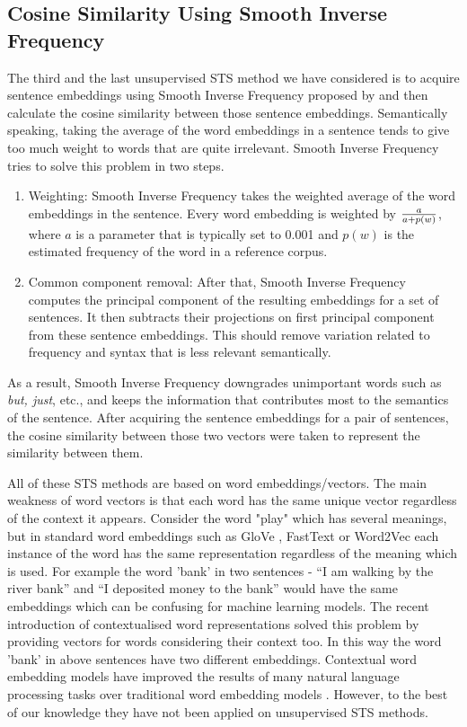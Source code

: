 \subsection{Cosine Similarity Using Smooth Inverse Frequency}
The third and the last unsupervised STS method we have considered is to acquire sentence embeddings using Smooth Inverse Frequency proposed by \citet{DBLP:conf/iclr/AroraLM17} and then calculate the cosine similarity between those sentence embeddings. Semantically speaking, taking the average of the word embeddings in a sentence tends to give too much weight to words that are quite irrelevant. Smooth Inverse Frequency tries to solve this problem in two steps. 

\begin{enumerate}
	\item Weighting: Smooth Inverse Frequency takes the weighted average of the word embeddings in the sentence. Every word embedding is weighted by $a\over{a + p(w)}$, where $a$ is a parameter that is typically set to 0.001 and $p(w)$ is the estimated frequency of the word in a reference corpus. 
	\item Common component removal: After that, Smooth Inverse Frequency computes the principal component of the resulting embeddings for a set of sentences. It then subtracts their projections on first principal component from these sentence embeddings. This should remove variation related to frequency and syntax that is less relevant semantically.
\end{enumerate}

As a result, Smooth Inverse Frequency downgrades unimportant words such as \emph{but, just}, etc., and keeps the information that contributes most to the semantics of the sentence. After acquiring the sentence embeddings for a pair of sentences, the cosine similarity between those two vectors were taken to represent the similarity between them. 

All of these STS methods are based on word embeddings/vectors. The main weakness of word vectors is that each word has the same unique vector regardless of the context it appears. Consider the word "play" which has several meanings, but in standard word embeddings such as GloVe \cite{pennington2014glove}, FastText \cite{mikolov-etal-2018-advances} or Word2Vec  \cite{10.5555/2999792.2999959} each instance of the word has the same representation regardless of the meaning which is used. For example the word 'bank' in two sentences - ``I am walking by the river bank'' and ``I deposited money to the bank'' would have the same embeddings which can be confusing for machine learning models. The recent introduction of contextualised word representations solved this problem by providing vectors for words considering their context too. In this way the word 'bank' in above sentences have two different embeddings. Contextual word embedding models have improved the results of many natural language processing tasks over traditional word embedding models \cite{peters-etal-2018-deep, devlin-etal-2019-bert}. However, to the best of our knowledge they have not been applied on unsupervised STS methods.

